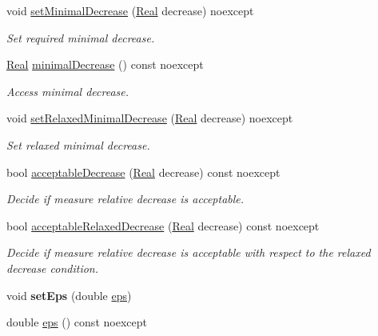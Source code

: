 \begin{DoxyCompactItemize}
\item 
void \hyperlink{classSpacy_1_1Mixin_1_1DecreaseCondition_aabc5e2473edace0c87da7fbd9fa0ae61}{set\+Minimal\+Decrease} (\hyperlink{classSpacy_1_1Real}{Real} decrease) noexcept
\begin{DoxyCompactList}\small\item\em Set required minimal decrease. \end{DoxyCompactList}\item 
\hyperlink{classSpacy_1_1Real}{Real} \hyperlink{classSpacy_1_1Mixin_1_1DecreaseCondition_aeeda8b1d9f177fe5dd532e42de09ab44}{minimal\+Decrease} () const noexcept
\begin{DoxyCompactList}\small\item\em Access minimal decrease. \end{DoxyCompactList}\item 
void \hyperlink{classSpacy_1_1Mixin_1_1DecreaseCondition_a86d6a8c8fc683c31572fd818a102a362}{set\+Relaxed\+Minimal\+Decrease} (\hyperlink{classSpacy_1_1Real}{Real} decrease) noexcept
\begin{DoxyCompactList}\small\item\em Set relaxed minimal decrease. \end{DoxyCompactList}\item 
bool \hyperlink{classSpacy_1_1Mixin_1_1DecreaseCondition_a69c0c90daf14fc40461876f71c49ffc2}{acceptable\+Decrease} (\hyperlink{classSpacy_1_1Real}{Real} decrease) const noexcept
\begin{DoxyCompactList}\small\item\em Decide if measure relative decrease is acceptable. \end{DoxyCompactList}\item 
bool \hyperlink{classSpacy_1_1Mixin_1_1DecreaseCondition_a5ffb5bc008544db96d935a0ca34dcd24}{acceptable\+Relaxed\+Decrease} (\hyperlink{classSpacy_1_1Real}{Real} decrease) const noexcept
\begin{DoxyCompactList}\small\item\em Decide if measure relative decrease is acceptable with respect to the relaxed decrease condition. \end{DoxyCompactList}\item 
\hypertarget{classSpacy_1_1Mixin_1_1Eps_a1bbfd62541610d5d80f2782ab77158e4}{}void {\bfseries set\+Eps} (double \hyperlink{classSpacy_1_1Mixin_1_1Eps_a40e2ba8f3abd2b5370ef41238cfaaf8b}{eps})\label{classSpacy_1_1Mixin_1_1Eps_a1bbfd62541610d5d80f2782ab77158e4}

\item 
\hypertarget{classSpacy_1_1Mixin_1_1Eps_a40e2ba8f3abd2b5370ef41238cfaaf8b}{}double \hyperlink{classSpacy_1_1Mixin_1_1Eps_a40e2ba8f3abd2b5370ef41238cfaaf8b}{eps} () const noexcept\label{classSpacy_1_1Mixin_1_1Eps_a40e2ba8f3abd2b5370ef41238cfaaf8b}


\end{DoxyCompactItemize}
